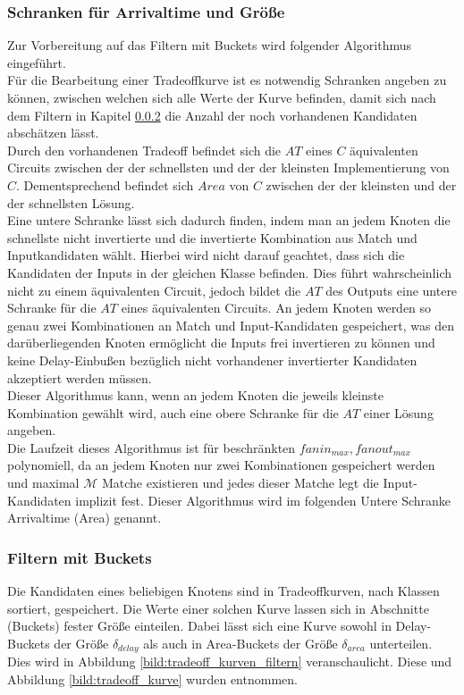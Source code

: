 \documentclass[11pt, a4paper, german]{article}
\begin{document}
\subsubsection{Schranken für Arrivaltime und Größe}
\label{subsubsec:schrankenalgo}
Zur Vorbereitung auf das Filtern mit Buckets wird folgender Algorithmus eingeführt.\\
Für die Bearbeitung einer Tradeoffkurve ist es notwendig Schranken angeben zu können, zwischen welchen sich alle Werte der Kurve befinden, damit sich nach dem Filtern in Kapitel \ref{subsubsec:filtern} die Anzahl der noch vorhandenen Kandidaten abschätzen lässt. \\
Durch den vorhandenen Tradeoff befindet sich die $AT$ eines $C$ äquivalenten Circuits zwischen der der schnellsten und der der kleinsten Implementierung von $C$. Dementsprechend befindet sich $Area$ von $C$ zwischen der der kleinsten und der der schnellsten Lösung. \\
Eine untere Schranke lässt sich dadurch finden, indem man an jedem Knoten die schnellste nicht invertierte und die invertierte Kombination aus Match und Inputkandidaten wählt. Hierbei wird nicht darauf geachtet, dass sich die Kandidaten der Inputs in der gleichen Klasse befinden. Dies führt wahrscheinlich nicht zu einem äquivalenten Circuit, jedoch bildet die $AT$ des Outputs eine untere Schranke für die $AT$ eines äquivalenten Circuits. An jedem Knoten werden so genau zwei Kombinationen an Match und Input-Kandidaten gespeichert, was den darüberliegenden Knoten ermöglicht die Inputs frei invertieren zu können und keine Delay-Einbußen bezüglich nicht vorhandener invertierter Kandidaten akzeptiert werden müssen. \\
Dieser Algorithmus kann, wenn an jedem Knoten die jeweils kleinste Kombination gewählt wird,  auch eine obere Schranke für die $AT$ einer Lösung angeben. \\
Die Laufzeit dieses Algorithmus ist für beschränkten $fanin_{max}, fanout_{max}$ polynomiell, da an jedem Knoten nur zwei Kombinationen gespeichert werden und maximal $\mathcal{M}$ Matche existieren und jedes dieser Matche legt die Input-Kandidaten implizit fest.  Dieser Algorithmus wird im folgenden Untere Schranke Arrivaltime (Area) genannt.

\subsubsection{Filtern mit Buckets}
\label{subsubsec:filtern}
Die Kandidaten eines beliebigen Knotens sind in Tradeoffkurven, nach Klassen sortiert, gespeichert. Die Werte einer solchen Kurve lassen sich in Abschnitte (Buckets) fester Größe einteilen. Dabei lässt sich eine Kurve sowohl in Delay-Buckets  der Größe $\delta_{delay}$ als auch in Area-Buckets der Größe $\delta_{area}$ unterteilen. Dies wird in Abbildung \ref{bild:tradeoff_kurven_filtern} veranschaulicht. Diese und Abbildung \ref{bild:tradeoff_kurve} wurden \cite{Elbert} entnommen. \\
\end{document}
